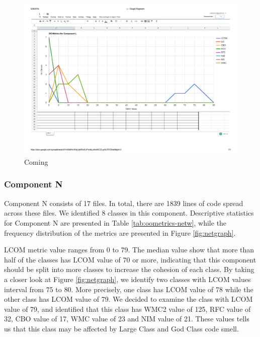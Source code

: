 \begin{landscape}
\setlength\LTleft{-.5in}
	\begin{figure}
	\centering
	\includegraphics[width=\textwidth]{images/log.pdf}
	\caption{Coming}
	\label{fig:loggraph}
	\end{figure}
\end{landscape}







\subsubsection{Component N}
Component N consists of 17 files. In total, there are 1839 lines of code spread across these files. We identified 8 classes in this component. Descriptive statistics for Component N are presented in Table \ref{tab:oometrics-netw}, while the frequency distribution of the metrics are presented in Figure \ref{fig:netgraph}.

LCOM metric value ranges from 0 to 79. The median value show that more than half of the classes has LCOM value of 70 or more, indicating that this component should be split into more classes to increase the cohesion of each class. By taking a closer look at Figure \ref{fig:netgraph}, we identify two classes with LCOM values interval from 75 to 80. More precisely, one class has LCOM value of 78 while the other class has LCOM value of 79. We decided to examine the class with LCOM value of 79, and identified that this class has WMC2 value of 125, RFC value of 32, CBO value of 17, WMC value of 23 and NIM value of 21. These values tells us that this class may be affected by Large Class and God Class code smell.



